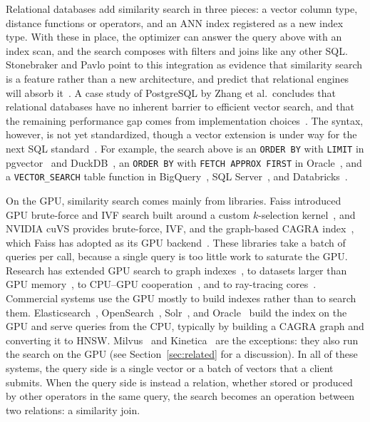 Relational databases add similarity search in three pieces: a vector column type, distance functions or operators, and an ANN index registered as a new index type.
With these in place, the optimizer can answer the query above with an index scan, and the search composes with filters and joins like any other SQL\@.
Stonebraker and Pavlo point to this integration as evidence that similarity search is a feature rather than a new architecture, and predict that relational engines will absorb it~\cite{StonebrakerPavloAround24}.
A case study of PostgreSQL by Zhang et al.\ concludes that relational databases have no inherent barrier to efficient vector search, and that the remaining performance gap comes from implementation choices~\cite{ZhangPgLimits24}.
The syntax, however, is not yet standardized, though a vector extension is under way for the next SQL standard~\cite{EisentrautSQL202y25}.
For example, the search above is an \texttt{ORDER BY} with \texttt{LIMIT} in pgvector~\cite{PgvectorRepo} and DuckDB~\cite{DuckDBVSS}, an \texttt{ORDER BY} with \texttt{FETCH APPROX FIRST} in Oracle~\cite{OracleAIVectorSearch}, and a \texttt{VECTOR\_SEARCH} table function in BigQuery~\cite{BigQueryVectorSearchFn}, SQL Server~\cite{SQLServerVectorSearchFn}, and Databricks~\cite{DatabricksVectorSearchFn26}.

On the GPU, similarity search comes mainly from libraries.
Faiss introduced GPU brute-force and IVF search built around a custom $k$-selection kernel~\cite{JohnsonFaissGPU21}, and NVIDIA cuVS provides brute-force, IVF, and the graph-based CAGRA index~\cite{NvidiaCuVS26, OotomoCAGRA24}, which Faiss has adopted as its GPU backend~\cite{MetaFaissCuVS25}.
These libraries take a batch of queries per call, because a single query is too little work to saturate the GPU\@.
Research has extended GPU search to graph indexes~\cite{ZhaoSONG19, GrohGGNN22}, to datasets larger than GPU memory~\cite{KarthikBANG24, ZhangRummy24}, to CPU--GPU cooperation~\cite{TianFusionANNS25}, and to ray-tracing cores~\cite{LiuJuno24}.
Commercial systems use the GPU mostly to build indexes rather than to search them.
Elasticsearch~\cite{ElasticGPUIndexing}, OpenSearch~\cite{OpenSearchGPU25}, Solr~\cite{SolrCuVS}, and Oracle~\cite{OracleVectorIndexService} build the index on the GPU and serve queries from the CPU, typically by building a CAGRA graph and converting it to HNSW\@.
Milvus~\cite{MilvusGPUIndex} and Kinetica~\cite{KineticaVectorSearch} are the exceptions: they also run the search on the GPU (see Section~\ref{sec:related} for a discussion).
In all of these systems, the query side is a single vector or a batch of vectors that a client submits.
When the query side is instead a relation, whether stored or produced by other operators in the same query, the search becomes an operation between two relations: a similarity join.

